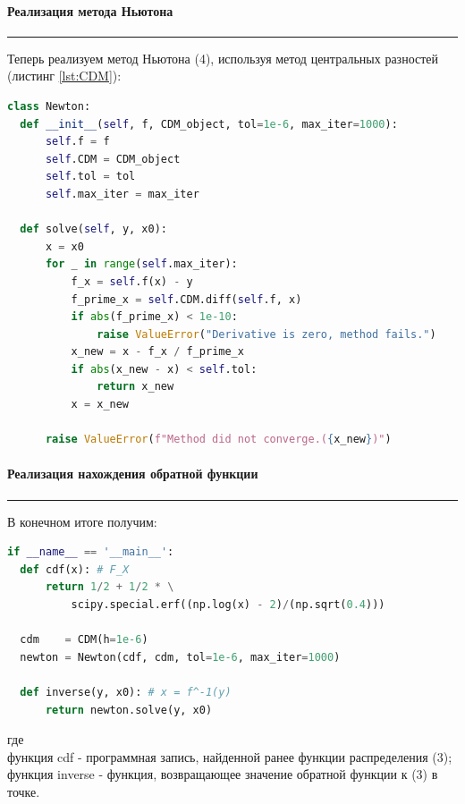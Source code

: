 \documentclass[a4paper, 14pt]{extarticle}
\begin{document}
\paragraph{Реализация метода Ньютона}\vspace{-20pt}\rule{\linewidth}{0.1mm}

Теперь реализуем метод Ньютона (4), используя метод центральных разностей 
(листинг \ref{lst:CDM}):

\begin{lstlisting}[language=Python, 
  caption={Реализация метода Ньютона}, 
  label={lst:Newton}]
class Newton:
  def __init__(self, f, CDM_object, tol=1e-6, max_iter=1000):
      self.f = f
      self.CDM = CDM_object
      self.tol = tol 
      self.max_iter = max_iter

  def solve(self, y, x0):
      x = x0
      for _ in range(self.max_iter):
          f_x = self.f(x) - y
          f_prime_x = self.CDM.diff(self.f, x)
          if abs(f_prime_x) < 1e-10:
              raise ValueError("Derivative is zero, method fails.")
          x_new = x - f_x / f_prime_x
          if abs(x_new - x) < self.tol:
              return x_new
          x = x_new

      raise ValueError(f"Method did not converge.({x_new})")
\end{lstlisting}

\paragraph{Реализация нахождения обратной функции}\vspace{-20pt}\rule{\linewidth}{0.1mm}

В конечном итоге получим:\\

\begin{lstlisting}[language=Python, 
                   caption={Реализация нахождения обратной функции}, 
                   label={lst:inverse}]
if __name__ == '__main__':
  def cdf(x): # F_X
      return 1/2 + 1/2 * \
          scipy.special.erf((np.log(x) - 2)/(np.sqrt(0.4)))

  cdm    = CDM(h=1e-6)
  newton = Newton(cdf, cdm, tol=1e-6, max_iter=1000)

  def inverse(y, x0): # x = f^-1(y)
      return newton.solve(y, x0)
\end{lstlisting}
\vspace{10pt}
где\\ 
функция cdf - программная запись, найденной ранее функции распределения (3);\\
функция inverse - функция, возвращающее значение обратной функции к (3) в точке.\\
\end{document}
